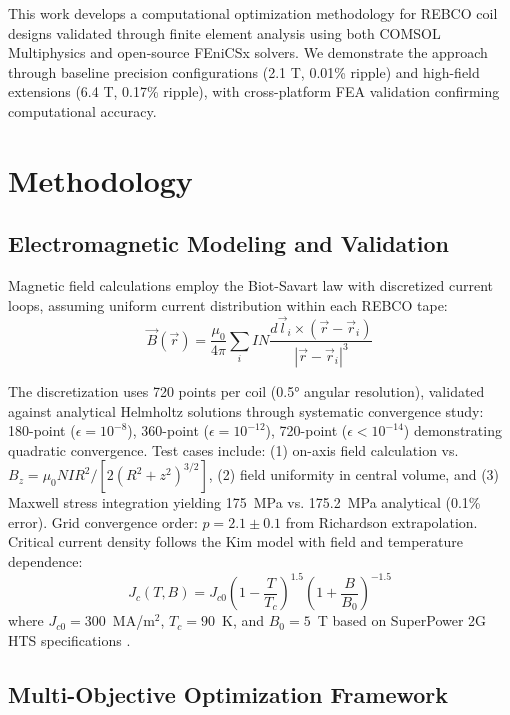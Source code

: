 \documentclass[aps,prb,preprint,amsmath,amssymb]{revtex4-2}
\begin{document}
This work develops a computational optimization methodology for REBCO coil designs validated through finite element analysis using both COMSOL Multiphysics and open-source FEniCSx solvers. We demonstrate the approach through baseline precision configurations (2.1 T, 0.01\% ripple) and high-field extensions (6.4 T, 0.17\% ripple), with cross-platform FEA validation confirming computational accuracy.

\section{Methodology}

\subsection{Electromagnetic Modeling and Validation}

Magnetic field calculations employ the Biot-Savart law with discretized current loops, assuming uniform current distribution within each REBCO tape:
\begin{equation}
\vec{B}(\vec{r}) = \frac{\mu_0}{4\pi} \sum_{i} I N \frac{d\vec{l}_i \times (\vec{r} - \vec{r}_i)}{|\vec{r} - \vec{r}_i|^3}
\end{equation}

The discretization uses 720 points per coil (0.5° angular resolution), validated against analytical Helmholtz solutions through systematic convergence study: 180-point ($\epsilon = 10^{-8}$), 360-point ($\epsilon = 10^{-12}$), 720-point ($\epsilon < 10^{-14}$) demonstrating quadratic convergence. Test cases include: (1) on-axis field calculation vs. $B_z = \mu_0 NI R^2 / [2(R^2 + z^2)^{3/2}]$, (2) field uniformity in central volume, and (3) Maxwell stress integration yielding 175~MPa vs. 175.2~MPa analytical (0.1\% error). Grid convergence order: $p = 2.1 \pm 0.1$ from Richardson extrapolation. Critical current density follows the Kim model with field and temperature dependence:
\begin{equation}
J_c(T,B) = J_{c0} \left(1-\frac{T}{T_c}\right)^{1.5} \left(1+\frac{B}{B_0}\right)^{-1.5}
\end{equation}
where $J_{c0}=300$~MA/m$^2$, $T_c=90$~K, and $B_0=5$~T based on SuperPower 2G HTS specifications \cite{superpower2022}.

\subsection{Multi-Objective Optimization Framework}
\end{document}
